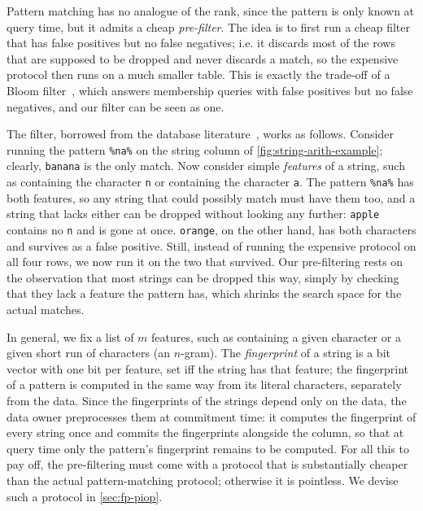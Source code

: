  Pattern matching has no analogue of the rank, since the pattern is only known at query time, but it admits a cheap \emph{pre-filter}. 
The idea is to first run a cheap filter that has false positives but no false negatives; i.e. it discards most of the rows that are supposed to be dropped and never discards a match, so the expensive protocol then runs on a much smaller table. This is exactly the trade-off of a Bloom filter~\cite{Bloom70}, which answers membership queries with false positives but no false negatives, and our filter can be seen as one.

The filter, borrowed from the database literature~\cite{string_fingerprint}, works as follows. Consider running the pattern \texttt{\%na\%} on the string column of \cref{fig:string-arith-example}; clearly, \texttt{banana} is the only match. Now consider simple \emph{features} of a string, such as containing the character \texttt{n} or containing the character \texttt{a}. The pattern \texttt{\%na\%} has both features, so any string that could possibly match must have them too, and a string that lacks either can be dropped without looking any further: \texttt{apple} contains no \texttt{n} and is gone at once. \texttt{orange}, on the other hand, has both characters and survives as a false positive. Still, instead of running the expensive protocol on all four rows, we now run it on the two that survived. Our pre-filtering rests on the observation that most strings can be dropped this way, simply by checking that they lack a feature the pattern has, which shrinks the search space for the actual matches. 

In general, we fix a list of $m$ features, such as containing a given character or a given short run of characters (an $n$-gram). The \emph{fingerprint} of a string is a bit vector with one bit per feature, set iff the string has that feature; the fingerprint of a pattern is computed in the same way from its literal characters, separately from the data. Since the fingerprints of the strings depend only on the data, the data owner preprocesses them at commitment time: it computes the fingerprint of every string once and commits the fingerprints alongside the column, so that at query time only the pattern's fingerprint remains to be computed. For all this to pay off, the pre-filtering must come with a protocol that is substantially cheaper than the actual pattern-matching protocol; otherwise it is pointless. We devise such a protocol in \cref{sec:fp-piop}.

